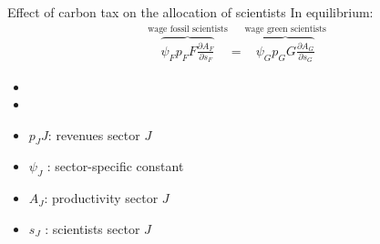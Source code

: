 \documentclass[11pt,aspectratio=169]{beamer}
\begin{document}

\begin{frame}{Effect of carbon tax on the allocation of scientists}
\vspace{2mm}
In equilibrium: \large
\begin{align*}
	\overbrace{{\psi_F} p_F{F}\frac{\partial A_{F}}{\partial s_{F}}}^{\text{wage fossil scientists}}=\overbrace{{\psi_G} p_G{G}\frac{\partial A_{G}}{\partial s_{G}}}^{\text{wage green scientists}}
\end{align*}
\normalsize
\begin{itemize}
	\item[] %
	\item[] %
\end{itemize}
\small
\vspace{4mm}
\hspace{-2mm}
\begin{minipage}[t!]{0.4\textwidth}
	\vspace{0mm}
	\begin{itemize}
		\item[] $p_JJ$: revenues sector $J$
		\vspace{-2mm}
		\item[] $\psi_J$ : sector-specific constant
	\end{itemize}
\end{minipage}
\vspace{-5mm}
\begin{minipage}[t!]{0.5\textwidth}
	\vspace{0mm}
	\begin{itemize}	
		\item[] $A_J$: productivity sector $J$
		\vspace{-2mm}			
		\item[] $s_J$ : scientists sector $J$
	\end{itemize}
\end{minipage}
\end{frame}
\end{document}
